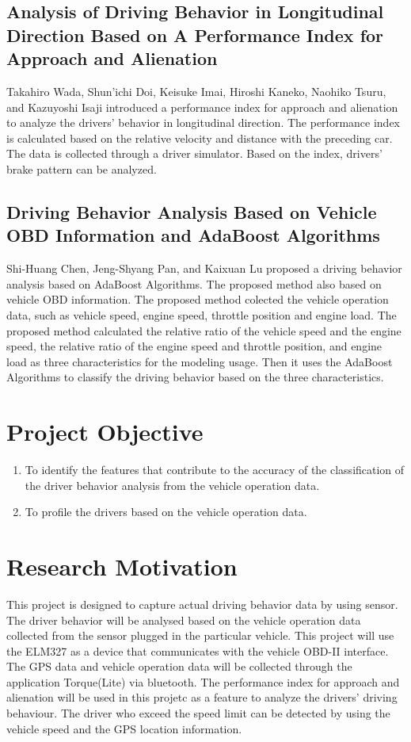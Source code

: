 \subsection{Analysis of Driving Behavior in Longitudinal Direction Based on A Performance Index for Approach and Alienation}
Takahiro Wada, Shun'ichi Doi, Keisuke Imai, Hiroshi Kaneko, Naohiko Tsuru, and Kazuyoshi Isaji introduced a performance index for approach and alienation to analyze the drivers' behavior in longitudinal direction. The performance index is calculated based on the relative velocity and distance with the preceding car. The data is collected through a driver simulator. Based on the index, drivers' brake pattern can be analyzed.

\subsection{Driving Behavior Analysis Based on Vehicle OBD Information and AdaBoost Algorithms}
Shi-Huang Chen, Jeng-Shyang Pan, and Kaixuan Lu proposed a driving behavior analysis based on AdaBoost Algorithms. The proposed method also based on vehicle OBD information. The proposed method colected the vehicle operation data, such as vehicle speed, engine speed, throttle position and engine load. The proposed method calculated the relative ratio of the vehicle speed and the engine speed, the relative ratio of the engine speed and throttle position, and engine load as three characteristics for the modeling usage. Then it uses the AdaBoost Algorithms to classify the driving behavior based on the three characteristics.

\section{Project Objective}
\begin{enumerate}
\item To identify the features that contribute to the accuracy of the classification of the driver behavior analysis from the vehicle operation data.
\item To profile the drivers based on the vehicle operation data. 
\end{enumerate}

\section{Research Motivation}
This project is designed to capture actual driving behavior data by using sensor. The driver behavior will be analysed based on the vehicle operation data collected from the sensor plugged in the particular vehicle.  
This project will use the ELM327 as a device that communicates with the vehicle OBD-II interface. The GPS data and vehicle operation data will be collected through the application Torque(Lite) via bluetooth. 
The performance index for approach and alienation will be used in this projetc as a feature to analyze the drivers' driving behaviour. The driver who exceed the speed limit can be detected by using the vehicle speed and the GPS location information.

